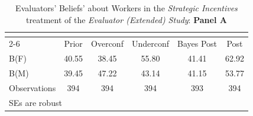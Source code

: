 \begin{table}[htbp]\centering
\caption{Evaluators' Beliefs' about Workers in the \textit{Strategic Incentives} treatment of the \textit{Evaluator (Extended) Study}: \textbf{Panel A}}
\begin{tabular}{l*{5}{c}}
\hline\hline
                &\multicolumn{5}{c}{}                             \\\cmidrule(lr){2-6}
                &\multicolumn{1}{c}{Prior}&\multicolumn{1}{c}{Overconf}&\multicolumn{1}{c}{Underconf}&\multicolumn{1}{c}{Bayes Post}&\multicolumn{1}{c}{Post}\\
\hline
B(F)            &    40.55&    38.45&    55.80&    41.41&    62.92\\
B(M)            &    39.45&    47.22&    43.14&    41.15&    53.77\\
\hline
Observations    &      394&      394&      394&      393&      394\\
\hline\hline
\multicolumn{6}{l}{\footnotesize SEs are robust}\\
\end{tabular}
\end{table}
